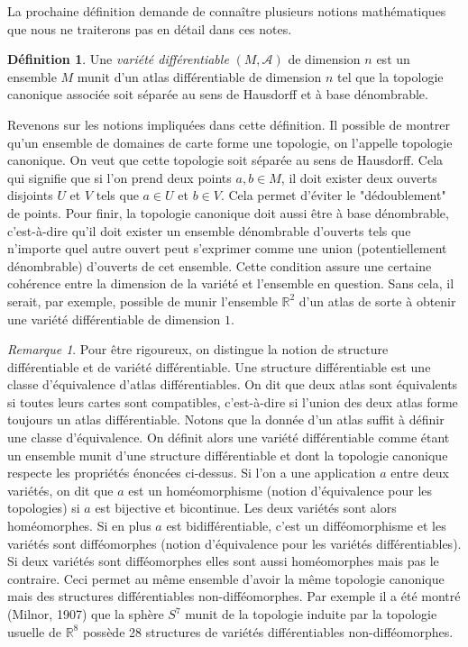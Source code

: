 \documentclass[a4paper,11pt]{report}
\theoremstyle{definition}
\theoremstyle{plain}
\theoremstyle{definition}
\newtheorem{defn}{Définition}[chapter]
\theoremstyle{remark}
\newtheorem{rmk}{Remarque}[chapter]
\newcommand{\A}{\mathcal{A}}
\begin{document}
            La prochaine définition demande de connaître plusieurs notions mathématiques que nous ne traiterons pas en détail dans ces notes.
            
            \begin{defn}
                Une \textit{variété différentiable} $(M,\A)$ de dimension $n$ est un ensemble $M$ munit d'un atlas différentiable de dimension $n$ tel que la topologie canonique associée soit séparée au sens de Hausdorff et à base dénombrable.
            \end{defn}
            
            Revenons sur les notions impliquées dans cette définition. Il possible de montrer qu'un ensemble de domaines de carte forme une topologie, on l'appelle topologie canonique. On veut que cette topologie soit séparée au sens de Hausdorff. Cela qui signifie que si l'on prend deux points $a, b \in M$, il doit exister deux ouverts disjoints $U$ et $V$ tels que $a \in U$ et $b \in V$. Cela permet d'éviter le "dédoublement" de points. Pour finir, la topologie canonique doit aussi être à base dénombrable, c'est-à-dire qu'il doit exister un ensemble dénombrable d'ouverts tels que n'importe quel autre ouvert peut s'exprimer comme une union (potentiellement dénombrable) d'ouverts de cet ensemble. Cette condition assure une certaine cohérence entre la dimension de la variété et l'ensemble en question. Sans cela, il serait, par exemple, possible de munir l'ensemble $\mathbb{R}^2$ d'un atlas de sorte à obtenir une variété différentiable de dimension $1$.
            
            \begin{rmk}
                Pour être rigoureux, on distingue la notion de structure différentiable et de variété différentiable. Une structure différentiable est une classe d'équivalence d'atlas différentiables. On dit que deux atlas sont équivalents si toutes leurs cartes sont compatibles, c'est-à-dire si l'union des deux atlas forme toujours un atlas différentiable. Notons que la donnée d'un atlas suffit à définir une classe d'équivalence. On définit alors une variété différentiable comme étant un ensemble munit d'une structure différentiable et dont la topologie canonique respecte les propriétés énoncées ci-dessus. Si l'on a une application $a$ entre deux variétés, on dit que $a$ est un homéomorphisme (notion d'équivalence pour les topologies) si $a$ est bijective et bicontinue. Les deux variétés sont alors homéomorphes. Si en plus $a$ est bidifférentiable, c'est un difféomorphisme et les variétés sont difféomorphes (notion d'équivalence pour les variétés différentiables). Si deux variétés sont difféomorphes elles sont aussi homéomorphes mais pas le contraire. Ceci permet au même ensemble d'avoir la même topologie canonique mais des structures différentiables non-difféomorphes. Par exemple il a été montré (Milnor, 1907) que la sphère $S^7$ munit de la topologie induite par la topologie usuelle de $\mathbb{R}^8$ possède 28 structures de variétés différentiables non-difféomorphes.
            \end{rmk}
            
\end{document}

